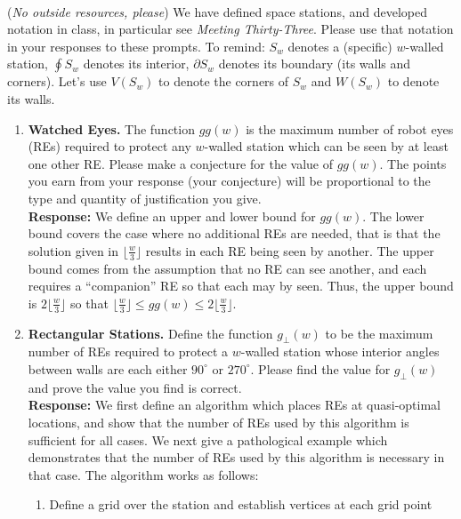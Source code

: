 \documentclass{article}
\newcommand{\response}[1]{\leavevmode\\[0.05in]{\bf Response: } #1 \leavevmode\\[0.05in]}
\begin{document}
\vspace{2em}
\noindent \underline{\hspace{5in}}
\vspace{2em}
\\
\noindent(\emph{No outside resources, please}) We have defined space stations, and developed notation in class, in particular see \emph{Meeting Thirty-Three}.  Please use that notation in your responses to these prompts.  To remind: $S_w$ denotes a (specific) $w$-walled station, $\oint S_w$ denotes its interior, $\partial S_w$ denotes its boundary (its walls and corners).  Let's use $V(S_w)$ to denote the corners of $S_w$ and $W(S_w)$ to denote its walls.\\
\begin{enumerate}
	\item {\bf Watched Eyes.} The function $gg(w)$ is the maximum number of robot eyes (REs) required to protect any $w$-walled station which can be seen by at least one other RE.  Please make a conjecture for the value of $gg(w)$.  The points you earn from your response (your conjecture) will be proportional to the type and quantity of justification you give.  
		\response{We define an upper and lower bound for $gg(w)$.  The lower bound covers the case where no additional REs are needed, that is that the solution given in $\lfloor \frac{w}{3} \rfloor$ results in each RE being seen by another.  The upper bound comes from the assumption that no RE can see another, and each requires a ``companion'' RE so that each may by seen.  Thus, the upper bound is $2\lfloor\frac{w}{3}\rfloor$ so that $\lfloor\frac{w}{3}\rfloor \le gg(w) \le 2\lfloor\frac{w}{3}\rfloor$.}
	\item {\bf Rectangular Stations.}  Define the function $g_{\perp}(w)$ to be the maximum number of REs required to protect a $w$-walled station whose interior angles between walls are each either $90^{\circ}$ or $270^{\circ}$.  Please find the value for $g_{\perp}(w)$ and prove the value you find is correct.
		\response{We first define an algorithm which places REs at quasi-optimal locations, and show that the number of REs used by this algorithm is sufficient for all cases.  We next give a pathological example which demonstrates that the number of REs used by this algorithm is necessary in that case. The algorithm works as follows:
		\begin{enumerate}
			\item Define a grid over the station and establish vertices at each grid point

\end{enumerate}}
\end{enumerate}
\end{document}
